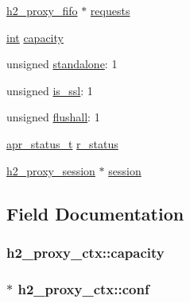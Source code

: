 \begin{DoxyCompactItemize}
\item 
\hyperlink{structh2__proxy__fifo}{h2\+\_\+proxy\+\_\+fifo} $\ast$ \hyperlink{structh2__proxy__ctx_a0c3fe72861729090980f8ccd98500bec}{requests}
\item 
\hyperlink{pcre_8txt_a42dfa4ff673c82d8efe7144098fbc198}{int} \hyperlink{structh2__proxy__ctx_afed95f08e2db3eb326761522fa0b66d8}{capacity}
\item 
unsigned \hyperlink{structh2__proxy__ctx_ab5108d32dbd7866d57f9e656e5dee3c8}{standalone}\+: 1
\item 
unsigned \hyperlink{structh2__proxy__ctx_a4ab43d3e1b553545753993cf6d2cc8d8}{is\+\_\+ssl}\+: 1
\item 
unsigned \hyperlink{structh2__proxy__ctx_a33dc08e6a9459005ee2a3b235780d432}{flushall}\+: 1
\item 
\hyperlink{group__apr__errno_gaa5105fa83cc322f09382292db8b47593}{apr\+\_\+status\+\_\+t} \hyperlink{structh2__proxy__ctx_aae6b4165bc8484f4f5dd8dcd9449e666}{r\+\_\+status}
\item 
\hyperlink{structh2__proxy__session}{h2\+\_\+proxy\+\_\+session} $\ast$ \hyperlink{structh2__proxy__ctx_a53285981382ef1b2a528424f6b268adc}{session}
\end{DoxyCompactItemize}


\subsection{Field Documentation}
\subsubsection[{\texorpdfstring{capacity}{capacity}}]{ h2\+\_\+proxy\+\_\+ctx\+::capacity}\hypertarget{structh2__proxy__ctx_afed95f08e2db3eb326761522fa0b66d8}{}\label{structh2__proxy__ctx_afed95f08e2db3eb326761522fa0b66d8}
\subsubsection[{\texorpdfstring{conf}{conf}}]{$\ast$ h2\+\_\+proxy\+\_\+ctx\+::conf}\hypertarget{structh2__proxy__ctx_a88b3d5b16e922c686893a68ff8d9ecad}{}\label{structh2__proxy__ctx_a88b3d5b16e922c686893a68ff8d9ecad}

